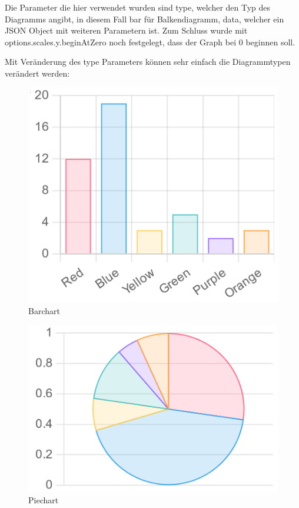 Die Parameter die hier verwendet wurden sind type, welcher den Typ des Diagramms angibt,
in diesem Fall bar für Balkendiagramm, data, welcher ein JSON Object mit weiteren Parametern ist.
Zum Schluss wurde mit options.scales.y.beginAtZero noch festgelegt, dass der Graph bei 0 beginnen soll.

Mit Veränderung des type Parameters können sehr einfach die Diagrammtypen verändert werden:
\begin{figure}[H]
    \centering
    \includegraphics[scale=0.3]{pics/barChart.png}
    \caption{Barchart}
    \label{fig:tech:barchart}
\end{figure}
\begin{figure}[H]
    \centering
    \includegraphics[scale=0.3]{pics/pieChart.png}
    \caption{Piechart}
    \label{fig:tech:piechart}
\end{figure}
